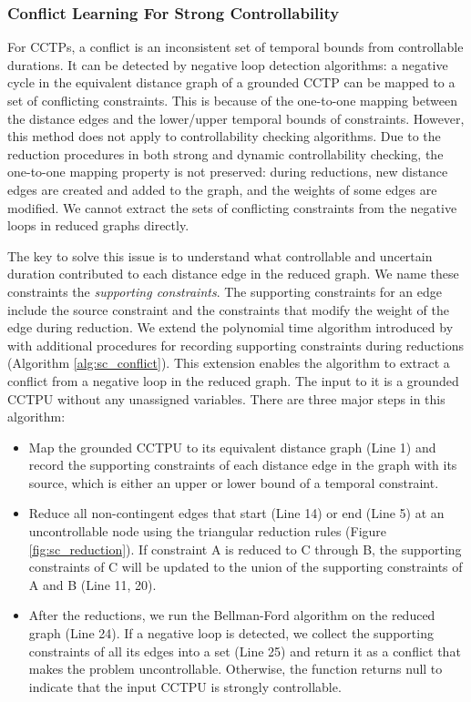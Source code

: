 \documentclass[jair,twoside,11pt,theapa]{article}
\begin{document}
\subsubsection{Conflict Learning For Strong Controllability}


For CCTPs, a conflict is an inconsistent set of temporal bounds from controllable durations. It can
be detected by negative loop detection algorithms: a negative cycle in the
equivalent distance graph of a grounded CCTP can be mapped to a set of
conflicting constraints. This is because of the one-to-one mapping between the
distance edges and the lower/upper temporal bounds of constraints. However, this
method does not apply to controllability checking algorithms. Due to the
reduction procedures in both strong and dynamic controllability checking, the one-to-one mapping property is not preserved: during reductions,
new distance edges are created and added to the graph, and the weights of some
edges are modified. We cannot extract the sets of conflicting constraints from
the negative loops in reduced graphs directly.

The key to solve this issue is to understand what controllable and uncertain duration contributed to
each distance edge in the reduced graph. We name these constraints the
\textit{supporting constraints}. The supporting constraints for an edge include
the source constraint and the constraints that modify the weight of the edge
during reduction. We extend the polynomial time algorithm introduced by
 with additional procedures for recording
supporting constraints during reductions (Algorithm \ref{alg:sc_conflict}). This
extension enables the algorithm to extract a conflict from a negative loop in
the reduced graph. The input to it is a grounded CCTPU without any unassigned
variables. There are three major steps in this algorithm: 

\begin{itemize}
	\item Map the grounded CCTPU to its equivalent distance graph (Line 1) and
	record the supporting constraints of each distance edge in the graph with its
	source, which is either an upper or lower bound of a temporal constraint.
	
	\item Reduce all non-contingent edges that start (Line 14) or end (Line 5) at an
	uncontrollable node using the triangular reduction rules (Figure \ref{fig:sc_reduction}). If constraint A is
	reduced to C through B, the supporting constraints of C will be updated to the
	union of the supporting constraints of A and B (Line 11, 20). 
	
	\item After the reductions, we run the Bellman-Ford algorithm on the reduced
	graph (Line 24). If a negative loop is detected, we collect the supporting
	constraints of all its edges into a set (Line 25) and return it as a conflict
	that makes the problem uncontrollable. Otherwise, the function returns null to
	indicate that the input CCTPU is strongly controllable.
\end{itemize}
\end{document}
